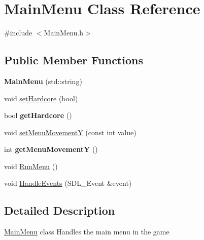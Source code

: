 \hypertarget{class_main_menu}{\section{\-Main\-Menu \-Class \-Reference}
\label{class_main_menu}
}


{\ttfamily \#include $<$\-Main\-Menu.\-h$>$}

\subsection*{\-Public \-Member \-Functions}
\begin{DoxyCompactItemize}
\item 
\hypertarget{class_main_menu_a3d953e074d641bc0f1fc6bcb6066478b}{{\bfseries \-Main\-Menu} (std\-::string)}\label{class_main_menu_a3d953e074d641bc0f1fc6bcb6066478b}

\item 
void \hyperlink{class_main_menu_a2a49751a62c77a848b7bcd76b7d406dc}{set\-Hardcore} (bool)
\item 
\hypertarget{class_main_menu_a7110cc17fa19de482b6575d52f8163e5}{bool {\bfseries get\-Hardcore} ()}\label{class_main_menu_a7110cc17fa19de482b6575d52f8163e5}

\item 
void \hyperlink{class_main_menu_ad6016a12bbd2e08aa6f43446c6a1119c}{set\-Menu\-Movement\-Y} (const int value)
\item 
\hypertarget{class_main_menu_ad3887a30c62433843d4c5608140203ce}{int {\bfseries get\-Menu\-Movement\-Y} ()}\label{class_main_menu_ad3887a30c62433843d4c5608140203ce}

\item 
void \hyperlink{class_main_menu_a45f48c4ae5146c316f8bb9a8d7eb22c7}{\-Run\-Menu} ()
\item 
void \hyperlink{class_main_menu_ab250bbe6fabb50f791ede530b1824de5}{\-Handle\-Events} (\-S\-D\-L\-\_\-\-Event \&event)
\end{DoxyCompactItemize}


\subsection{\-Detailed \-Description}
\hyperlink{class_main_menu}{\-Main\-Menu} class \-Handles the main menu in the game 

